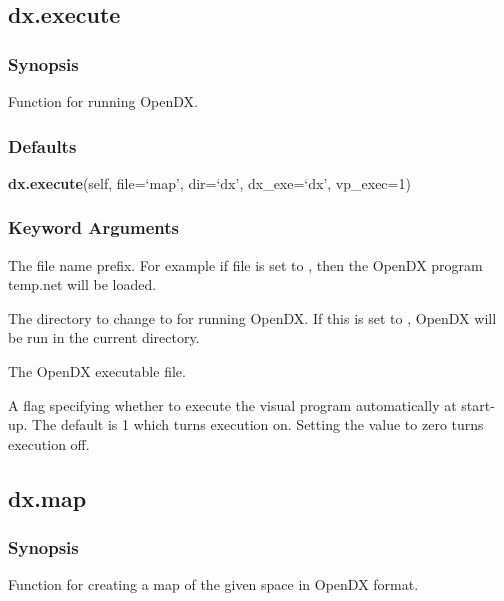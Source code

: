 \subsection{dx.execute}


\subsubsection{Synopsis}

Function for running OpenDX.



\subsubsection{Defaults}

\textsf{\textbf{dx.execute}(self, file=`map', dir=`dx', dx\_exe=`dx', vp\_exec=1)}


\subsubsection{Keyword Arguments}

  The file name prefix.  For example if file is set to , then the OpenDX program temp.net will be loaded. 

  The directory to change to for running OpenDX.  If this is set to , OpenDX will be run in the current directory. 

  The OpenDX executable file. 

  A flag specifying whether to execute the visual program automatically at start-up.  The default is 1 which turns execution on.  Setting the value to zero turns execution off. 





\newpage

\subsection{dx.map}


\subsubsection{Synopsis}

Function for creating a map of the given space in OpenDX format.



